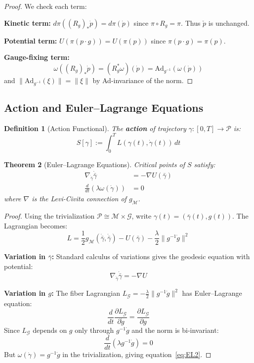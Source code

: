 \documentclass[11pt]{article}
\newtheorem{theorem}{Theorem}[section]
\newtheorem{definition}[theorem]{Definition}
\begin{document}
\begin{proof}
We check each term:

\textbf{Kinetic term:} $d\pi((R_g)_* \dot{p}) = d\pi(\dot{p})$ since $\pi \circ R_g = \pi$. Thus $\check{p}$ is unchanged.

\textbf{Potential term:} $U(\pi(p \cdot g)) = U(\pi(p))$ since $\pi(p \cdot g) = \pi(p)$.

\textbf{Gauge-fixing term:}
\[
\omega((R_g)_* \dot{p}) = (R_g^* \omega)(\dot{p}) = \mathrm{Ad}_{g^{-1}}(\omega(\dot{p}))
\]
and $\|\mathrm{Ad}_{g^{-1}}(\xi)\| = \|\xi\|$ by Ad-invariance of the norm.
\end{proof}

\subsection{Action and Euler--Lagrange Equations}

\begin{definition}[Action Functional]
The \textbf{action} of trajectory $\gamma : [0, T] \to \mathcal{P}$ is:
\[
S[\gamma] := \int_0^T L(\gamma(t), \dot{\gamma}(t)) \, dt
\]
\end{definition}

\begin{theorem}[Euler--Lagrange Equations]
Critical points of $S$ satisfy:
\begin{align}
\nabla_{\dot{\bar{\gamma}}} \dot{\bar{\gamma}} &= -\nabla U(\bar{\gamma}) \label{eq:EL1} \\
\frac{d}{dt}(\lambda \omega(\dot{\gamma})) &= 0 \label{eq:EL2}
\end{align}
where $\nabla$ is the Levi-Civita connection of $g_{\mathcal{M}}$.
\end{theorem}

\begin{proof}
Using the trivialization $\mathcal{P} \cong \mathcal{M} \times \mathcal{G}$, write $\gamma(t) = (\bar{\gamma}(t), g(t))$.
The Lagrangian becomes:
\[
L = \frac{1}{2} g_{\mathcal{M}}(\dot{\bar{\gamma}}, \dot{\bar{\gamma}}) - U(\bar{\gamma}) - \frac{\lambda}{2}\|g^{-1}\dot{g}\|^2
\]

\textbf{Variation in $\bar{\gamma}$:} Standard calculus of variations gives the geodesic equation with potential:
\[
\nabla_{\dot{\bar{\gamma}}} \dot{\bar{\gamma}} = -\nabla U
\]

\textbf{Variation in $g$:} The fiber Lagrangian $L_{\mathcal{G}} = -\frac{\lambda}{2}\|g^{-1}\dot{g}\|^2$ has Euler--Lagrange equation:
\[
\frac{d}{dt}\frac{\partial L_{\mathcal{G}}}{\partial \dot{g}} = \frac{\partial L_{\mathcal{G}}}{\partial g}
\]
Since $L_{\mathcal{G}}$ depends on $g$ only through $g^{-1}\dot{g}$ and the norm is bi-invariant:
\[
\frac{d}{dt}(\lambda g^{-1} \dot{g}) = 0
\]
But $\omega(\dot{\gamma}) = g^{-1}\dot{g}$ in the trivialization, giving equation~\eqref{eq:EL2}.
\end{proof}
\end{document}
